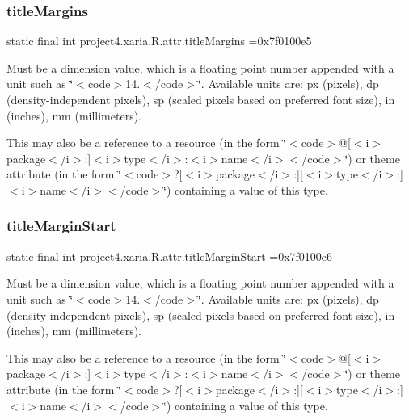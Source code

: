 \subsubsection{\texorpdfstring{title\+Margins}{titleMargins}}
{\footnotesize\ttfamily static final int project4.\+xaria.\+R.\+attr.\+title\+Margins =0x7f0100e5\hspace{0.3cm}{\ttfamily [static]}}

Must be a dimension value, which is a floating point number appended with a unit such as \char`\"{}$<$code$>$14.\+5sp$<$/code$>$\char`\"{}. Available units are\+: px (pixels), dp (density-\/independent pixels), sp (scaled pixels based on preferred font size), in (inches), mm (millimeters). 

This may also be a reference to a resource (in the form \char`\"{}$<$code$>$@\mbox{[}$<$i$>$package$<$/i$>$\+:\mbox{]}$<$i$>$type$<$/i$>$\+:$<$i$>$name$<$/i$>$$<$/code$>$\char`\"{}) or theme attribute (in the form \char`\"{}$<$code$>$?\mbox{[}$<$i$>$package$<$/i$>$\+:\mbox{]}\mbox{[}$<$i$>$type$<$/i$>$\+:\mbox{]}$<$i$>$name$<$/i$>$$<$/code$>$\char`\"{}) containing a value of this type. \mbox{\label{classproject4_1_1xaria_1_1R_1_1attr_aba51383cd6c25710b454bb8286cd4000}} 
\subsubsection{\texorpdfstring{title\+Margin\+Start}{titleMarginStart}}
{\footnotesize\ttfamily static final int project4.\+xaria.\+R.\+attr.\+title\+Margin\+Start =0x7f0100e6\hspace{0.3cm}{\ttfamily [static]}}

Must be a dimension value, which is a floating point number appended with a unit such as \char`\"{}$<$code$>$14.\+5sp$<$/code$>$\char`\"{}. Available units are\+: px (pixels), dp (density-\/independent pixels), sp (scaled pixels based on preferred font size), in (inches), mm (millimeters). 

This may also be a reference to a resource (in the form \char`\"{}$<$code$>$@\mbox{[}$<$i$>$package$<$/i$>$\+:\mbox{]}$<$i$>$type$<$/i$>$\+:$<$i$>$name$<$/i$>$$<$/code$>$\char`\"{}) or theme attribute (in the form \char`\"{}$<$code$>$?\mbox{[}$<$i$>$package$<$/i$>$\+:\mbox{]}\mbox{[}$<$i$>$type$<$/i$>$\+:\mbox{]}$<$i$>$name$<$/i$>$$<$/code$>$\char`\"{}) containing a value of this type. \mbox{\label{classproject4_1_1xaria_1_1R_1_1attr_aa83afdd7261db5ec23d63e2f1926065f}} 
